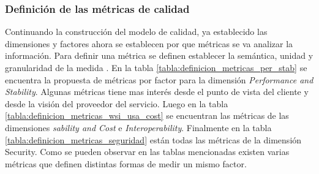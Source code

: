 \subsubsection{Definición de las métricas de calidad}
Continuando la construcción del modelo de calidad, ya establecido las dimensiones y factores ahora se establecen por que métricas se va analizar la información.
Para definir una métrica se definen establecer la semántica, unidad y granularidad de la medida \cite{Calidad:CursoCalidad}.
En la tabla \ref{tabla:definicion_metricas_per_stab} se encuentra la propuesta de métricas por factor para la dimensión \emph{Performance and Stability}. Algunas métricas tiene mas interés desde el punto de vista del cliente y desde la visión del proveedor del servicio.
Luego en la tabla \ref{tabla:definicion_metricas_wsi_usa_cost} se encuentran las métricas de las dimensiones  \emph{sability and Cost} e \emph{Interoperability}.
Finalmente en la tabla \ref{tabla:definicion_metricas_seguridad} están todas las métricas de la dimensión {Security}.
Como se pueden observar en las tablas mencionadas existen varias métricas que definen distintas formas de medir un mismo factor.

